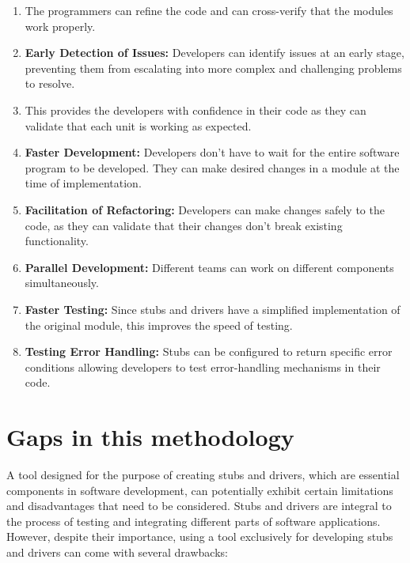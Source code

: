 \documentclass{article}
\begin{document}
\begin{enumerate}
    \item The programmers can refine the code and can cross-verify that the modules work properly. 
    \item \textbf{Early Detection of Issues:} Developers can identify issues at an early stage, preventing them from escalating into more complex and challenging problems to resolve.
    \item This provides the developers with confidence in their code as they can validate that each unit is working as expected.
    \item \textbf{Faster Development:} Developers don’t have to wait for the entire software program to be developed. They can make desired changes in a module at the time of implementation.
    \item \textbf{Facilitation of Refactoring:} Developers can make changes safely to the code, as they can validate that their changes don’t break existing functionality.
    \item \textbf{Parallel Development:} Different teams can work on different components simultaneously.
    \item \textbf{Faster Testing:} Since stubs and drivers have a simplified implementation of the original module, this improves the speed of testing.
    \item \textbf{Testing Error Handling:} Stubs can be configured to return specific error conditions allowing developers to test error-handling mechanisms in their code.
\end{enumerate}




\section{Gaps in this methodology}

A  tool designed for the purpose of creating stubs and drivers, which are essential components in software development, can potentially exhibit certain limitations and disadvantages that need to be considered. Stubs and drivers are integral to the process of testing and integrating different parts of software applications. However, despite their importance, using a tool exclusively for developing stubs and drivers can come with several drawbacks:
\end{document}
